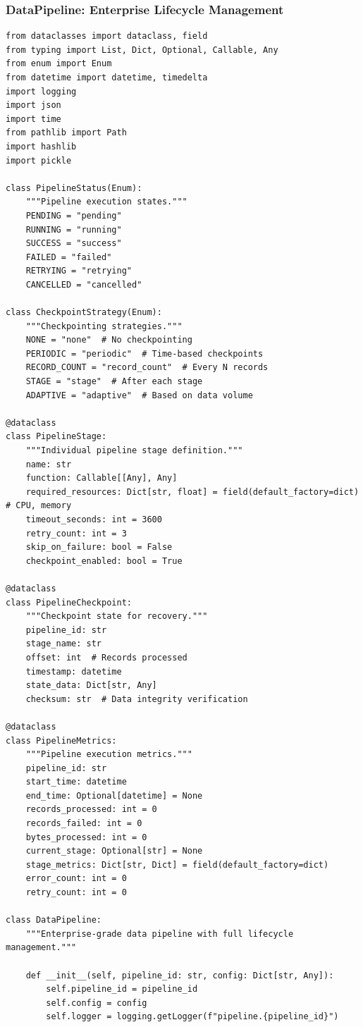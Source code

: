 \subsubsection{DataPipeline: Enterprise Lifecycle Management}

\begin{lstlisting}[style=python, caption=DataPipeline with Full Lifecycle Management]
from dataclasses import dataclass, field
from typing import List, Dict, Optional, Callable, Any
from enum import Enum
from datetime import datetime, timedelta
import logging
import json
import time
from pathlib import Path
import hashlib
import pickle

class PipelineStatus(Enum):
    """Pipeline execution states."""
    PENDING = "pending"
    RUNNING = "running"
    SUCCESS = "success"
    FAILED = "failed"
    RETRYING = "retrying"
    CANCELLED = "cancelled"

class CheckpointStrategy(Enum):
    """Checkpointing strategies."""
    NONE = "none"  # No checkpointing
    PERIODIC = "periodic"  # Time-based checkpoints
    RECORD_COUNT = "record_count"  # Every N records
    STAGE = "stage"  # After each stage
    ADAPTIVE = "adaptive"  # Based on data volume

@dataclass
class PipelineStage:
    """Individual pipeline stage definition."""
    name: str
    function: Callable[[Any], Any]
    required_resources: Dict[str, float] = field(default_factory=dict)  # CPU, memory
    timeout_seconds: int = 3600
    retry_count: int = 3
    skip_on_failure: bool = False
    checkpoint_enabled: bool = True

@dataclass
class PipelineCheckpoint:
    """Checkpoint state for recovery."""
    pipeline_id: str
    stage_name: str
    offset: int  # Records processed
    timestamp: datetime
    state_data: Dict[str, Any]
    checksum: str  # Data integrity verification

@dataclass
class PipelineMetrics:
    """Pipeline execution metrics."""
    pipeline_id: str
    start_time: datetime
    end_time: Optional[datetime] = None
    records_processed: int = 0
    records_failed: int = 0
    bytes_processed: int = 0
    current_stage: Optional[str] = None
    stage_metrics: Dict[str, Dict] = field(default_factory=dict)
    error_count: int = 0
    retry_count: int = 0

class DataPipeline:
    """Enterprise-grade data pipeline with full lifecycle management."""

    def __init__(self, pipeline_id: str, config: Dict[str, Any]):
        self.pipeline_id = pipeline_id
        self.config = config
        self.logger = logging.getLogger(f"pipeline.{pipeline_id}")


\end{lstlisting}
